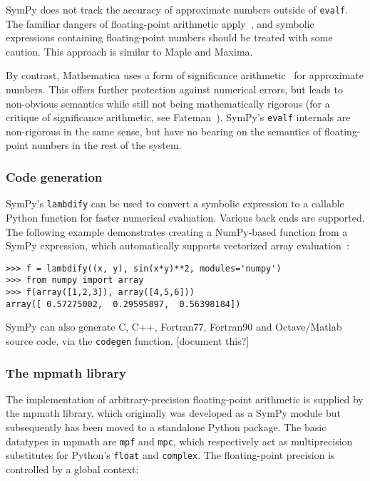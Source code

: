 SymPy does not track the accuracy of
approximate numbers outside of \texttt{evalf}.
The familiar dangers of floating-point arithmetic apply~\cite{goldberg1991every}, and
symbolic expressions containing floating-point numbers should be treated
with some caution.
This approach is similar to Maple and Maxima.

By contrast, Mathematica uses a form
of significance arithmetic~\cite{Sofroniou2005precise} for approximate numbers.
This offers further protection against numerical errors,
but leads to non-obvious semantics while
still not being mathematically rigorous
(for a critique of significance arithmetic, see Fateman~\cite{Fateman1992}).
SymPy's \texttt{evalf} internals are non-rigorous in the same sense,
but have no bearing on the semantics of floating-point
numbers in the rest of the system.

\subsubsection{Code generation}

SymPy's \texttt{lambdify} can be used to convert a symbolic expression to a
callable Python function for faster numerical evaluation.
Various back ends are supported. The following example
demonstrates creating a NumPy-based function from
a SymPy expression, which automatically supports
vectorized array evaluation~\cite{van2011numpy}:

\begin{verbatim}
>>> f = lambdify((x, y), sin(x*y)**2, modules='numpy')
>>> from numpy import array
>>> f(array([1,2,3]), array([4,5,6]))
array([ 0.57275002,  0.29595897,  0.56398184])
\end{verbatim}

SymPy can also generate C, C++, Fortran77, Fortran90 and
Octave/Matlab source code, via the \texttt{codegen} function. [document this?]

\subsubsection{The mpmath library}

The implementation of arbitrary-precision floating-point arithmetic
is supplied by the mpmath library, which originally was developed
as a SymPy module but subsequently has been
moved to a standalone Python package. The basic datatypes in mpmath
are \texttt{mpf} and \texttt{mpc}, which respectively act as
multiprecision substitutes for Python's \texttt{float} and \texttt{complex}.
The floating-point precision is controlled by a global context:

